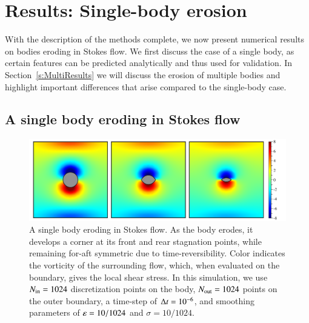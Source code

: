 \documentclass[preprint, 10pt]{elsarticle}
\begin{document}
\section{Results: Single-body erosion}
\label{s:SingleResults}
With the description of the methods complete, we now present numerical
results on bodies eroding in Stokes flow. We first discuss the case of a
single body, as certain features can be predicted analytically and thus
used for validation. In Section~\ref{s:MultiResults} we will discuss the erosion of multiple bodies and highlight important differences that arise compared to the single-body case.

\subsection{A single body eroding in Stokes flow}

\begin{figure}%
\begin{center}
\includegraphics[width = 0.80 \textwidth]{./figs/01bodseq.pdf}
\caption{A single body eroding in Stokes flow. As the body erodes, it develops a corner at its front and rear stagnation points, while remaining for-aft symmetric due to time-reversibility. Color indicates the vorticity of the surrounding flow, which, when evaluated on the boundary, gives the local shear stress. In this simulation, we use $N_{\mathrm{in}} = 1024$ discretization points on the body, $N_{\mathrm{out}} = 1024$ points on the outer boundary, a time-step of $\Delta t = 10^{-6}$, and smoothing parameters of $\varepsilon = 10/1024$ and $\sigma = 10/1024$.}
\label{01bodseq} 
\end{center}
\end{figure}
\end{document}
